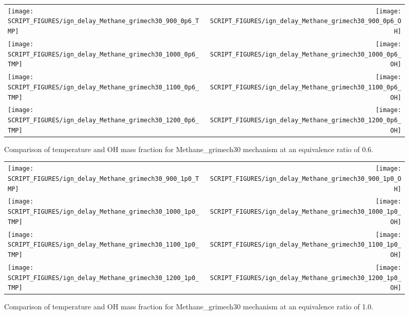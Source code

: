 \documentclass[11pt]{book}
\begin{document}
\begin{figure}[p]
\begin{tabular*}{\textwidth}{lr}
\texttt{[image: SCRIPT\_FIGURES/ign\_delay\_Methane\_grimech30\_900\_0p6\_TMP]} &
\texttt{[image: SCRIPT\_FIGURES/ign\_delay\_Methane\_grimech30\_900\_0p6\_OH]} \\
\texttt{[image: SCRIPT\_FIGURES/ign\_delay\_Methane\_grimech30\_1000\_0p6\_TMP]} &
\texttt{[image: SCRIPT\_FIGURES/ign\_delay\_Methane\_grimech30\_1000\_0p6\_OH]} \\
\texttt{[image: SCRIPT\_FIGURES/ign\_delay\_Methane\_grimech30\_1100\_0p6\_TMP]} &
\texttt{[image: SCRIPT\_FIGURES/ign\_delay\_Methane\_grimech30\_1100\_0p6\_OH]} \\
\texttt{[image: SCRIPT\_FIGURES/ign\_delay\_Methane\_grimech30\_1200\_0p6\_TMP]} &
\texttt{[image: SCRIPT\_FIGURES/ign\_delay\_Methane\_grimech30\_1200\_0p6\_OH]}
\end{tabular*}
\caption[Results of the {\ct ignition\_delay} test cases]{Comparison of temperature and OH mass fraction for Methane\_grimech30 mechanism at an equivalence ratio of 0.6.}
\label{fig:ign_delay_Methane_grimech30_phi_0.6}
\end{figure}

\begin{figure}[p]
\begin{tabular*}{\textwidth}{lr}
\texttt{[image: SCRIPT\_FIGURES/ign\_delay\_Methane\_grimech30\_900\_1p0\_TMP]} &
\texttt{[image: SCRIPT\_FIGURES/ign\_delay\_Methane\_grimech30\_900\_1p0\_OH]} \\
\texttt{[image: SCRIPT\_FIGURES/ign\_delay\_Methane\_grimech30\_1000\_1p0\_TMP]} &
\texttt{[image: SCRIPT\_FIGURES/ign\_delay\_Methane\_grimech30\_1000\_1p0\_OH]} \\
\texttt{[image: SCRIPT\_FIGURES/ign\_delay\_Methane\_grimech30\_1100\_1p0\_TMP]} &
\texttt{[image: SCRIPT\_FIGURES/ign\_delay\_Methane\_grimech30\_1100\_1p0\_OH]} \\
\texttt{[image: SCRIPT\_FIGURES/ign\_delay\_Methane\_grimech30\_1200\_1p0\_TMP]} &
\texttt{[image: SCRIPT\_FIGURES/ign\_delay\_Methane\_grimech30\_1200\_1p0\_OH]}
\end{tabular*}
\caption[Results of the {\ct ignition\_delay} test cases]{Comparison of temperature and OH mass fraction for Methane\_grimech30 mechanism at an equivalence ratio of 1.0.}
\label{fig:ign_delay_Methane_grimech30_phi_1.0}
\end{figure}
\end{document}

